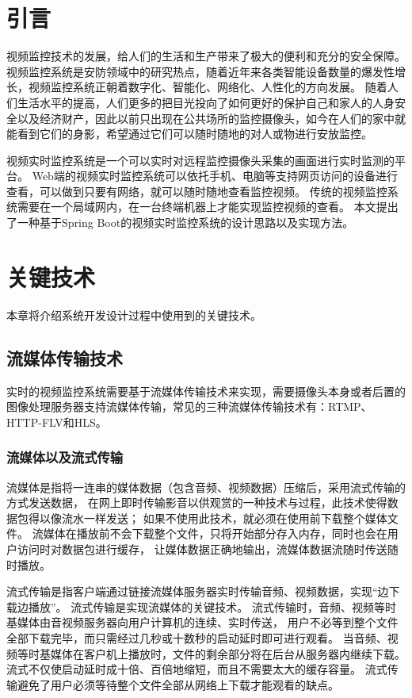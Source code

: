 \chapter{引言}
视频监控技术的发展，给人们的生活和生产带来了极大的便利和充分的安全保障。
视频监控系统是安防领域中的研究热点，随着近年来各类智能设备数量的爆发性增长，视频监控系统正朝着数字化、智能化、网络化、人性化的方向发展。
随着人们生活水平的提高，人们更多的把目光投向了如何更好的保护自己和家人的人身安全以及经济财产，因此以前只出现在公共场所的监控摄像头，如今在人们的家中就能看到它们的身影，希望通过它们可以随时随地的对人或物进行安放监控。

视频实时监控系统是一个可以实时对远程监控摄像头采集的画面进行实时监测的平台。
Web端的视频实时监控系统可以依托手机、电脑等支持网页访问的设备进行查看，可以做到只要有网络，就可以随时随地查看监控视频。
传统的视频监控系统需要在一个局域网内，在一台终端机器上才能实现监控视频的查看。
本文提出了一种基于Spring Boot的视频实时监控系统的设计思路以及实现方法。

\chapter{关键技术}
本章将介绍系统开发设计过程中使用到的关键技术。

\section{流媒体传输技术}
实时的视频监控系统需要基于流媒体传输技术来实现，需要摄像头本身或者后置的图像处理服务器支持流媒体传输，常见的三种流媒体传输技术有：RTMP、HTTP-FLV和HLS。

\subsection{流媒体以及流式传输}
流媒体是指将一连串的媒体数据（包含音频、视频数据）压缩后，采用流式传输的方式发送数据，
在网上即时传输影音以供观赏的一种技术与过程，此技术使得数据包得以像流水一样发送；
如果不使用此技术，就必须在使用前下载整个媒体文件。
流媒体在播放前不会下载整个文件，只将开始部分存入内存，同时也会在用户访问时对数据包进行缓存，
让媒体数据正确地输出，流媒体数据流随时传送随时播放。

流式传输是指客户端通过链接流媒体服务器实时传输音频、视频数据，实现“边下载边播放”。
流式传输是实现流媒体的关键技术。
流式传输时，音频、视频等时基媒体由音视频服务器向用户计算机的连续、实时传送，
用户不必等到整个文件全部下载完毕，而只需经过几秒或十数秒的启动延时即可进行观看。
当音频、视频等时基媒体在客户机上播放时，文件的剩余部分将在后台从服务器内继续下载。
流式不仅使启动延时成十倍、百倍地缩短，而且不需要太大的缓存容量。
流式传输避免了用户必须等待整个文件全部从网络上下载才能观看的缺点。

